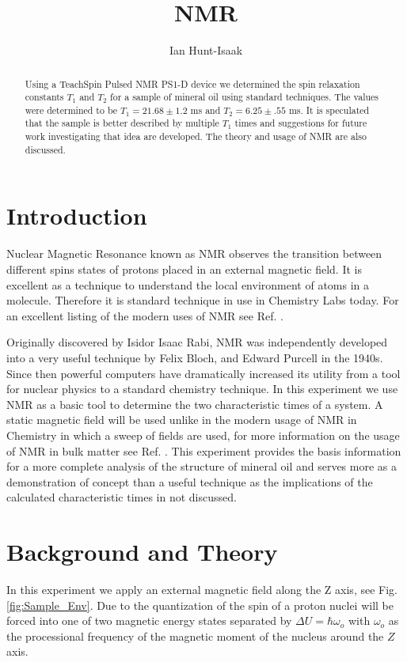\documentclass[11pt,letterpaper]{article}
\title{NMR}
\date{}
\author{Ian Hunt-Isaak}
\begin{document}
\maketitle
\begin{abstract}
Using a TeachSpin Pulsed NMR PS1-D device we determined the spin relaxation constants $T_1$ and $T_2$ for a sample of mineral oil using standard techniques. The values were determined to be $T_1=21.68\pm 1.2$ ms and $T_2=6.25\pm .55$ ms. It is speculated that the sample is better described by multiple $T_1$ times and suggestions for future work investigating that idea are developed. The theory and usage of NMR are also discussed.
\end{abstract}
\section{Introduction}
Nuclear Magnetic Resonance known as NMR observes the transition between different spins states of protons placed in an external magnetic field. It is excellent as a technique to understand the local environment of atoms in a molecule. Therefore it is standard technique in use in Chemistry Labs today. For an excellent listing of the modern uses of NMR see Ref. \cite{NMR_Uses}. 

Originally discovered by Isidor Isaac Rabi, NMR was independently developed into a very useful technique by Felix Bloch,  and Edward Purcell in the 1940s. Since then powerful computers have dramatically increased its utility from a tool for nuclear physics to a standard chemistry technique.
In this experiment we use NMR as a basic tool to determine the two characteristic times of a system. A static magnetic field will be used unlike in the modern usage of NMR in Chemistry in which a sweep of fields are used, for more information on the usage of NMR in bulk matter see Ref. \cite{Pake}. This experiment provides the basis information for a more complete analysis of the structure of mineral oil and serves more as a demonstration of concept than a useful technique as the implications of the calculated characteristic times in not discussed.
\section{Background and Theory}
In this experiment we apply an external magnetic field along the Z axis, see Fig. \ref{fig:Sample_Env}. Due to the quantization of the spin of a proton nuclei will be forced into one of two magnetic energy states separated by $\Delta U=\hbar\omega_o$ with $\omega_o$ as the processional frequency of the magnetic moment of the nucleus around the $Z$ axis.
\end{document}
